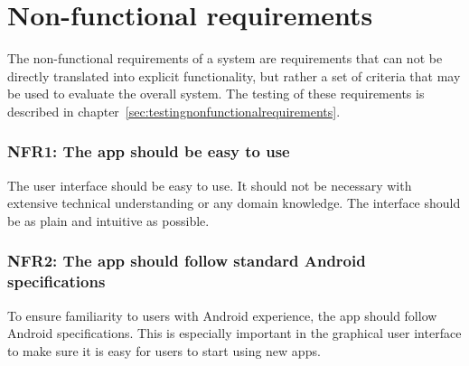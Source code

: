 \section{Non-functional requirements}
\label{sec:nonFunctionalReq}
The non-functional requirements of a system are requirements that can not be directly translated into explicit functionality, but rather a set of criteria that may be used to evaluate the overall system. The testing of these requirements is described in chapter~\ref{sec:testingnonfunctionalrequirements}.

\subsubsection{NFR1: The app should be easy to use}
The user interface should be easy to use. It should not be necessary with extensive technical understanding or any domain knowledge. The interface should be as plain and intuitive as possible. 

\subsubsection{NFR2: The app should follow standard Android specifications}
To ensure familiarity to users with Android experience, the app should follow Android specifications. This is especially important in the graphical user interface to make sure it is easy for users to start using new apps.
 
\begin{comment}

\subsubsection{NFR2: Installation guide and documentation}
The system should come with a comprehensive guide to using the system. This should include documentation for operation of the
app along with a guide to what the rest of the system operates. As the team will not be developing hardware for metering and 
aggregating data from homes, the main focus will be on the app and the team's central server. The documentation will contain an outline 
of the intended architecture for the rest of the system.


\begin{itemize}
\item The user interface should follow standard Android specifications. 
\item The applification should not need a lot of extra material to get started (Power devices, own server).
\end{itemize}

\end{comment}
